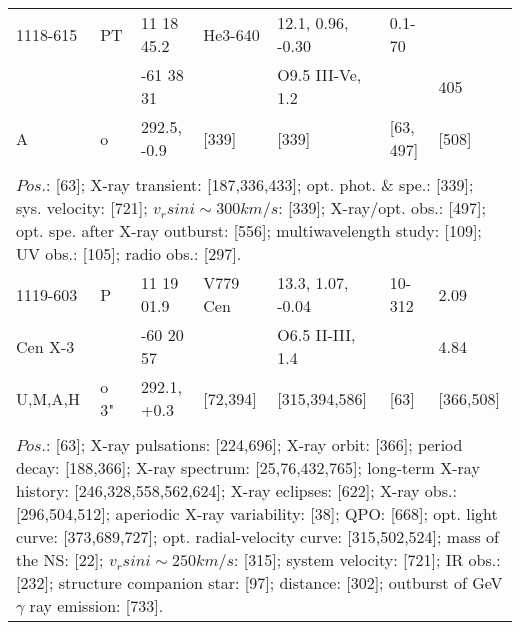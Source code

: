 \documentclass{aa}
\begin{document}
\begin{table*}[h]
\begin{tabular}{p{2.5cm}p{1cm}p{1.8cm}p{2.3cm}p{3.3cm}p{2.0cm}p{2.2cm}}
\noalign{\smallskip}
\hline
\noalign{\smallskip}
 1118-615      &   PT     & 11 18 45.2      & He3-640            & 12.1, 0.96, -0.30     &   0.1-70           &                  \\
                        &             & -61 38 31        &                             & O9.5 III-Ve, 1.2      &                          &  405         \\
    A                 &  o        & 292.5, -0.9       &     [339]               &    [339]                     &  [63, 497]        &   [508]         \\
\\
\multicolumn{7}{p{17.5cm}}{
$Pos$.: [63]; X-ray transient: [187,336,433]; opt. phot. \& spe.: [339]; sys. velocity: [721];
$v_rsin i \sim 300 km/s$: [339]; X-ray/opt. obs.: [497]; opt. spe. after X-ray outburst: [556]; multiwavelength study: [109];
UV obs.: [105]; radio obs.: [297].}\\

\noalign{\smallskip}
\hline
\noalign{\smallskip}
 1119-603     &   P      & 11 19 01.9      & V779 Cen           & 13.3, 1.07, -0.04     & 10-312         &  2.09       \\
 Cen X-3      &            & -60 20 57         &                              & O6.5 II-III, 1.4         &                       &  4.84       \\
U,M,A,H       &  o 3"  & 292.1, +0.3      &     [72,394]        & [315,394,586]         &        [63]        &  [366,508]    \\
\\
\multicolumn{7}{p{17.5cm}}{
$Pos$.: [63]; X-ray pulsations: [224,696]; X-ray orbit: [366]; period decay: [188,366]; X-ray spectrum: [25,76,432,765];
long-term X-ray history: [246,328,558,562,624]; X-ray eclipses: [622]; X-ray obs.: [296,504,512]; aperiodic X-ray
variability: [38]; QPO: [668]; opt. light curve: [373,689,727]; opt. radial-velocity curve: [315,502,524]; mass of the 
NS: [22]; $v_rsin i \sim 250 km/s$: [315]; system velocity: [721]; IR obs.: [232]; structure companion star: [97]; 
distance: [302]; outburst of GeV $\gamma$ ray emission: [733].}\\


\end{tabular}
\end{table*}
\end{document}
